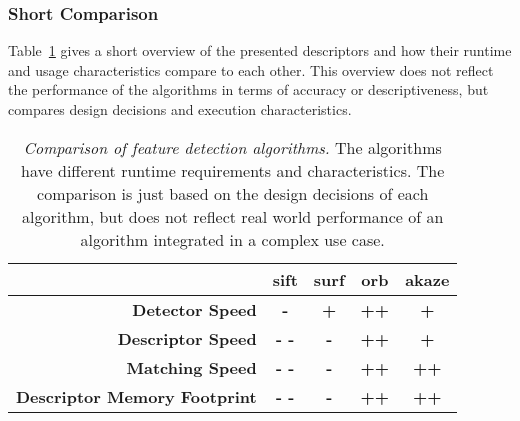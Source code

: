 \subsubsection{Short Comparison}

Table~\ref{tab:detector_comparison} gives a short overview of the presented descriptors and how their runtime and usage characteristics compare to each other.
This overview does not reflect the performance of the algorithms in terms of accuracy or descriptiveness, but compares design decisions and execution characteristics.
\begin{table}[H]
    {\renewcommand{\arraystretch}{1.3}%
    \setlength{\tabcolsep}{0.3em}%
    \footnotesize
    \begin{tabular}{rcccc}
    \toprule
    \null & \textbf{\acrshort{sift}} & \textbf{\acrshort{surf}} & \textbf{\acrshort{orb}} & \textbf{\acrshort{akaze}} \\
    \midrule
    \textbf{Detector Speed} & \textbf{-} & \textbf{+} & \textbf{++} & \textbf{+} \\
    \textbf{Descriptor Speed} & \textbf{- -} & \textbf{-} & \textbf{++} & \textbf{+} \\
    \textbf{Matching Speed} & \textbf{- -} & \textbf{-} & \textbf{++} & \textbf{++} \\
    \textbf{Descriptor Memory Footprint} & \textbf{- -} & \textbf{-} & \textbf{++} & \textbf{++} \\
    \bottomrule
    \end{tabular}
    }
    \caption[Comparison of feature detection algorithms]{\emph{Comparison of feature detection algorithms.} The algorithms have different runtime requirements and characteristics. The comparison is just based on the design decisions of each algorithm, but does not reflect real world performance of an algorithm integrated in a complex use case.}\label{tab:detector_comparison}
\end{table}
